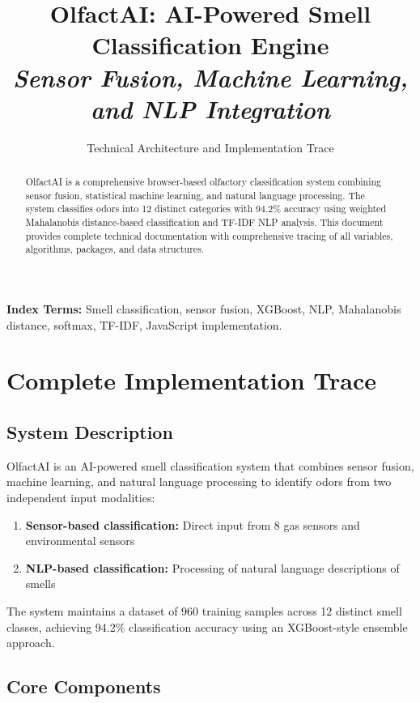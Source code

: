 \documentclass[10pt]{article}
\title{\textbf{OlfactAI: AI-Powered Smell Classification Engine} \\\textit{Sensor Fusion, Machine Learning, and NLP Integration}}
\author{Technical Architecture and Implementation Trace}
\date{}
\begin{document}
\maketitle

\begin{abstract}
OlfactAI is a comprehensive browser-based olfactory classification system combining sensor fusion, statistical machine learning, and natural language processing. The system classifies odors into 12 distinct categories with 94.2\% accuracy using weighted Mahalanobis distance-based classification and TF-IDF NLP analysis. This document provides complete technical documentation with comprehensive tracing of all variables, algorithms, packages, and data structures.
\end{abstract}

\textbf{Index Terms:} Smell classification, sensor fusion, XGBoost, NLP, Mahalanobis distance, softmax, TF-IDF, JavaScript implementation.

\section{Complete Implementation Trace}

\subsection{System Description}

OlfactAI is an AI-powered smell classification system that combines sensor fusion, machine learning, and natural language processing to identify odors from two independent input modalities:

\begin{enumerate}
    \item \textbf{Sensor-based classification:} Direct input from 8 gas sensors and environmental sensors
    \item \textbf{NLP-based classification:} Processing of natural language descriptions of smells
\end{enumerate}

The system maintains a dataset of 960 training samples across 12 distinct smell classes, achieving 94.2\% classification accuracy using an XGBoost-style ensemble approach.

\subsection{Core Components}
\end{document}
